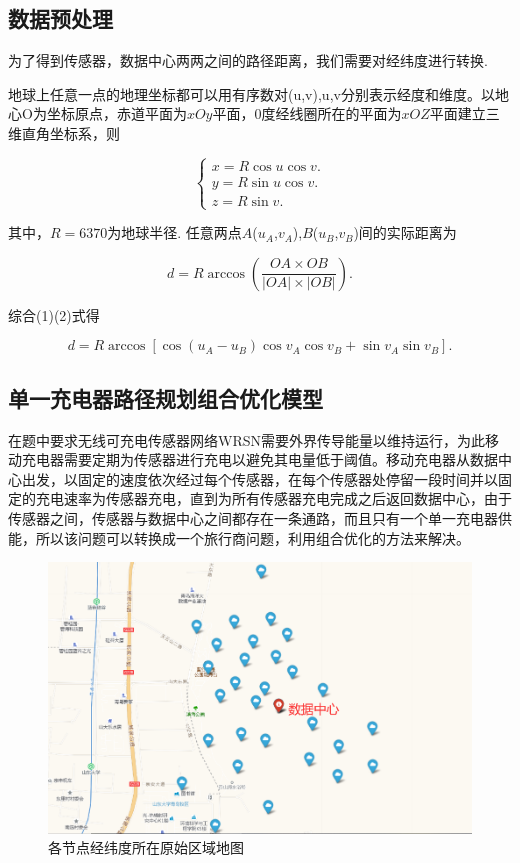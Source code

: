 \documentclass{whutmod}
\begin{document}
\subsection{数据预处理}
为了得到传感器，数据中心两两之间的路径距离，我们需要对经纬度进行转换.

地球上任意一点的地理坐标都可以用有序数对(u,v),u,v分别表示经度和维度。以地心O为坐标原点，赤道平面为$xOy$平面，0度经线圈所在的平面为$xOZ$平面建立三维直角坐标系，则

\begin{equation}\left\{\begin{array}{l}
		x=R \cos u \cos v .\\
		y=R \sin u \cos v .\\
		z=R \sin v.
	\end{array}\right.
\end{equation}

其中，$R=6370$为地球半径.
任意两点$A$($u_{A}$,$v_{A}$),$B$($u_{B}$,$v_{B}$)间的实际距离为

\begin{equation}
	d=R \arccos( \frac{OA\times OB}{|OA|\times |OB|}).
\end{equation}

综合(1)(2)式得

\begin{equation}
	d=R \arccos \left[\cos (u_{A}-u_{B})\cos v_{A} \cos v_{B}+\sin v_{A} \sin v_{B}\right].
\end{equation}

\subsection{单一充电器路径规划组合优化模型}
在题中要求无线可充电传感器网络WRSN需要外界传导能量以维持运行，为此移动充电器需要定期为传感器进行充电以避免其电量低于阈值。移动充电器从数据中心出发，以固定的速度依次经过每个传感器，在每个传感器处停留一段时间并以固定的充电速率为传感器充电，直到为所有传感器充电完成之后返回数据中心，由于传感器之间，传感器与数据中心之间都存在一条通路，而且只有一个单一充电器供能，所以该问题可以转换成一个旅行商问题，利用组合优化的方法来解决。
\begin{figure}[!htbp]
	\centering
	\includegraphics[width=.6\textwidth]{figures/origin.png}
	\caption{各节点经纬度所在原始区域地图}
\end{figure} 
\end{document}
